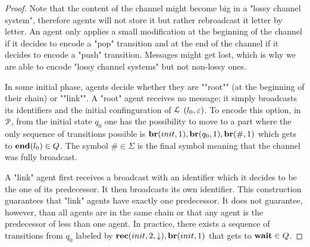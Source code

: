 \begin{proof}
	Note that the content of the channel might become big in a "lossy channel system", therefore agents will not store it but rather rebroadcast it letter by letter. An agent only applies a small modification at the beginning of the channel if it decides to encode a "pop" transition and at the end of the channel if it decides to encode a "push" transition. Messages might get lost, which is why we are able to encode "lossy channel systems" but not non-lossy ones.
	
	In some initial phase, agents decide whether they are ""root"" (at the beginning of their chain) or ""link"". A "root" agent receives no message; it simply broadcasts its identifiers and the initial confinguration of $\mathcal{L}$ $(l_0,\varepsilon)$. To encode this option, in $\mathcal{P}$, from the initial state $q_0$ one has the possibility to move to a part where the only sequence of transitions possible is $\br{\mathsf{init}}{1}, \br{\mathsf{q_0}}{1}, \br{\mathsf{\#}}{1}$ which gets to $\mathbf{end}(l_0) \in Q$. The symbol $\mathsf{\#} \in \Sigma$ is the final symbol meaning that the channel was fully broadcast. 
	
	A "link" agent first receives a broadcast with an identifier which it decides to be the one of its predecessor. It then broadcasts its own identifier. This construction guarantees that "link" agents have exactly one predecessor. It does not guarantee, however, than all agents are in the same chain or that any agent is the predecessor of less than one agent. In practice, there exists a sequence of transitions from $q_0$ labeled by $\rec{\mathsf{init}}{2}{\enregact}, \br{\mathsf{init}}{1}$ that gets to $\mathbf{wait} \in Q$. 
	

\end{proof}
